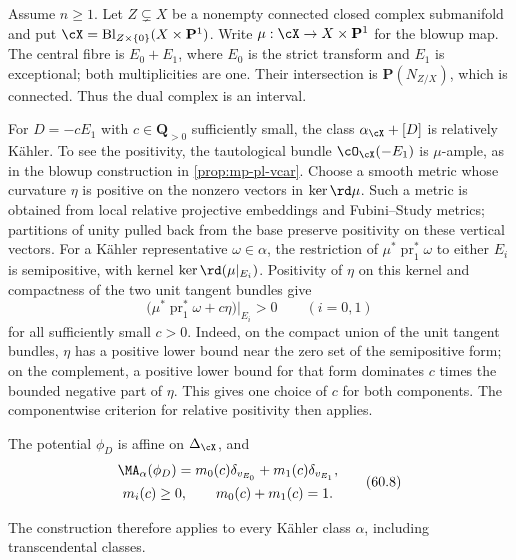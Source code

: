 \begin{example}\label{ex:mp-dnc}
Assume $n\geq1$.  Let $Z\subsetneq X$ be a
nonempty connected closed complex submanifold and put
$\cX=\operatorname{Bl}_{Z\times\{0\}}(X\times\mathbf P^1)$.
Write $\mu:\cX\to X\times\mathbf P^1$ for the blowup map. The central fibre is $E_0+E_1$, where $E_0$ is the strict transform and $E_1$ is exceptional; both multiplicities are one. Their intersection is $\mathbf P(N_{Z/X})$, which is connected. Thus the dual complex is an interval.

For $D=-cE_1$ with $c\in\mathbf Q_{>0}$ sufficiently small, the class $\alpha_{\cX}+[D]$ is relatively K\"ahler. To see the positivity, the tautological bundle $\cO_{\cX}(-E_1)$ is $\mu$-ample, as in the blowup construction in \cref{prop:mp-pl-vcar}. Choose a smooth metric whose curvature $\eta$ is positive on the nonzero vectors in $\ker\rd\mu$. Such a metric is obtained from local relative projective embeddings and Fubini--Study metrics; partitions of unity pulled back from the base preserve positivity on these vertical vectors. For a K\"ahler representative $\omega\in\alpha$, the restriction of $\mu^*\operatorname{pr}_1^*\omega$ to either $E_i$ is semipositive, with kernel $\ker\rd(\mu|_{E_i})$. Positivity of $\eta$ on this kernel and compactness of the two unit tangent bundles give
\[
 \bigl(\mu^*\operatorname{pr}_1^*\omega+c\eta\bigr)|_{E_i}>0
 \qquad (i=0,1)
\]
for all sufficiently small $c>0$. Indeed, on the compact union of the unit tangent bundles, $\eta$ has a positive lower bound near the zero set of the semipositive form; on the complement, a positive lower bound for that form dominates $c$ times the bounded negative part of $\eta$. This gives one choice of $c$ for both components. The componentwise criterion for relative positivity then applies.

\noindent\begin{minipage}{\linewidth}
The potential $\phi_D$ is affine on $\Delta_{\cX}$, and
\[
 \begin{gathered}
 \MA_\alpha(\phi_D)
   =m_0(c)\delta_{v_{E_0}}+m_1(c)\delta_{v_{E_1}},\\
 m_i(c)\geq0,\qquad m_0(c)+m_1(c)=1.
 \end{gathered}
\tag{60.8}\label{eq:mp-dnc-ma}
\]
\end{minipage}\par\smallskip
The construction therefore applies to every K\"ahler class $\alpha$, including transcendental classes.


\end{example}
